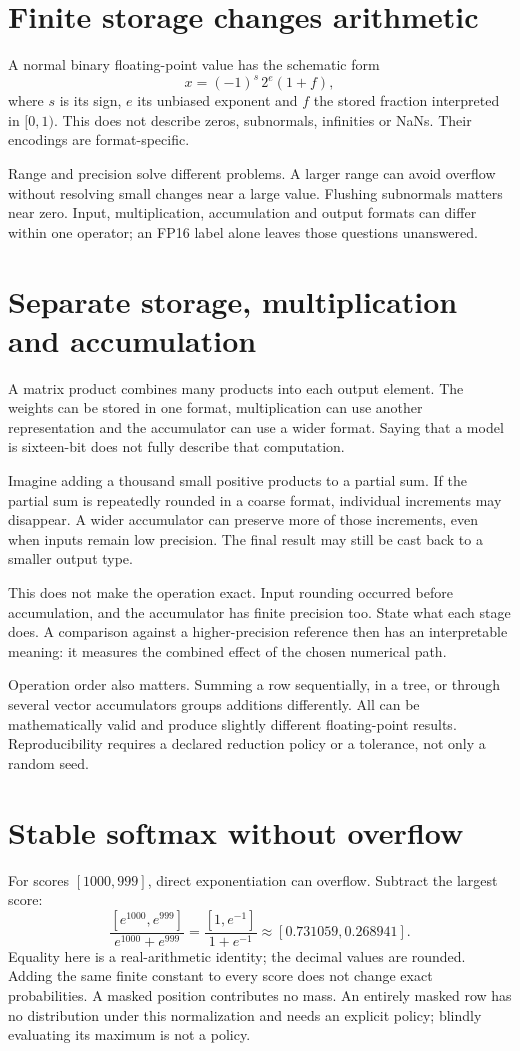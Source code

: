 \section{Finite storage changes arithmetic}
A normal binary floating-point value has the schematic form
\[
 x=(-1)^s\,2^e(1+f),
\]
where $s$ is its sign, $e$ its unbiased exponent and $f$ the stored fraction
interpreted in $[0,1)$. This does not describe zeros, subnormals, infinities
or NaNs. Their encodings are format-specific.

Range and precision solve different problems. A larger range can avoid
overflow without resolving small changes near a large value. Flushing
subnormals matters near zero. Input, multiplication, accumulation and
output formats can differ within one operator; an FP16 label alone leaves
those questions unanswered.

\section{Separate storage, multiplication and accumulation}
A matrix product combines many products into each output element.
The weights can be stored in one format, multiplication can use another
representation and the accumulator can use a wider format. Saying
that a model is sixteen-bit does not fully describe that computation.

Imagine adding a thousand small positive products to a partial sum.
If the partial sum is repeatedly rounded in a coarse format, individual
increments may disappear. A wider accumulator can preserve more of
those increments, even when inputs remain low precision. The final
result may still be cast back to a smaller output type.

This does not make the operation exact. Input rounding occurred before
accumulation, and the accumulator has finite precision too. State what
each stage does. A comparison against a higher-precision reference
then has an interpretable meaning: it measures the combined effect
of the chosen numerical path.

Operation order also matters. Summing a row sequentially, in a tree,
or through several vector accumulators groups additions differently.
All can be mathematically valid and produce slightly different
floating-point results. Reproducibility requires a declared reduction
policy or a tolerance, not only a random seed.

\section{Stable softmax without overflow}
For scores $[1000,999]$, direct exponentiation can overflow. Subtract the
largest score:
\[
 \frac{[e^{1000},e^{999}]}{e^{1000}+e^{999}}
 =\frac{[1,e^{-1}]}{1+e^{-1}}
 \approx[0.731059,0.268941].
\]
Equality here is a real-arithmetic identity; the decimal values are rounded.
Adding the same finite constant to every score does not change exact
probabilities. A masked position contributes no mass. An entirely masked
row has no distribution under this normalization and needs an explicit
policy; blindly evaluating its maximum is not a policy.

